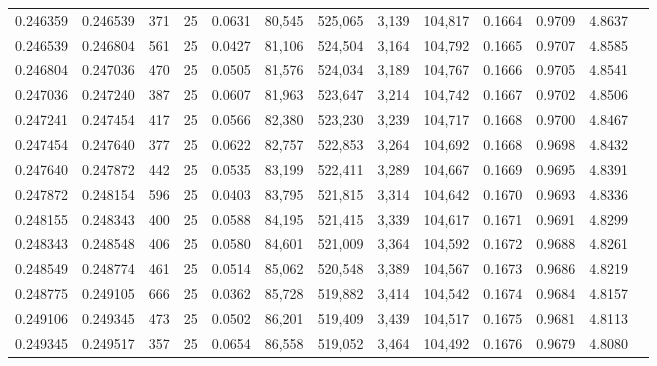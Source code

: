 \begin{tabular}{rrrrrrrrrrrrr}
0.246359 & 0.246539 &   371 &  25 &                                     0.0631 &  80,545 & 525,065 &   3,139 & 104,817 & 0.1664 & 0.9709 & 4.8637 \\
0.246539 & 0.246804 &   561 &  25 &                                     0.0427 &  81,106 & 524,504 &   3,164 & 104,792 & 0.1665 & 0.9707 & 4.8585 \\
0.246804 & 0.247036 &   470 &  25 &                                     0.0505 &  81,576 & 524,034 &   3,189 & 104,767 & 0.1666 & 0.9705 & 4.8541 \\
0.247036 & 0.247240 &   387 &  25 &                                     0.0607 &  81,963 & 523,647 &   3,214 & 104,742 & 0.1667 & 0.9702 & 4.8506 \\
0.247241 & 0.247454 &   417 &  25 &                                     0.0566 &  82,380 & 523,230 &   3,239 & 104,717 & 0.1668 & 0.9700 & 4.8467 \\
0.247454 & 0.247640 &   377 &  25 &                                     0.0622 &  82,757 & 522,853 &   3,264 & 104,692 & 0.1668 & 0.9698 & 4.8432 \\
0.247640 & 0.247872 &   442 &  25 &                                     0.0535 &  83,199 & 522,411 &   3,289 & 104,667 & 0.1669 & 0.9695 & 4.8391 \\
0.247872 & 0.248154 &   596 &  25 &                                     0.0403 &  83,795 & 521,815 &   3,314 & 104,642 & 0.1670 & 0.9693 & 4.8336 \\
0.248155 & 0.248343 &   400 &  25 &                                     0.0588 &  84,195 & 521,415 &   3,339 & 104,617 & 0.1671 & 0.9691 & 4.8299 \\
0.248343 & 0.248548 &   406 &  25 &                                     0.0580 &  84,601 & 521,009 &   3,364 & 104,592 & 0.1672 & 0.9688 & 4.8261 \\
0.248549 & 0.248774 &   461 &  25 &                                     0.0514 &  85,062 & 520,548 &   3,389 & 104,567 & 0.1673 & 0.9686 & 4.8219 \\
0.248775 & 0.249105 &   666 &  25 &                                     0.0362 &  85,728 & 519,882 &   3,414 & 104,542 & 0.1674 & 0.9684 & 4.8157 \\
0.249106 & 0.249345 &   473 &  25 &                                     0.0502 &  86,201 & 519,409 &   3,439 & 104,517 & 0.1675 & 0.9681 & 4.8113 \\
0.249345 & 0.249517 &   357 &  25 &                                     0.0654 &  86,558 & 519,052 &   3,464 & 104,492 & 0.1676 & 0.9679 & 4.8080 \\

\end{tabular}
